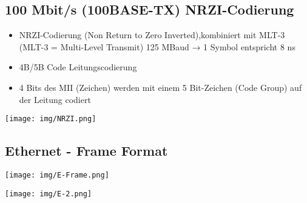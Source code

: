 \subsection{100 Mbit/s (100BASE-TX) NRZI-Codierung }{
    {  \begin{itemize}[noitemsep]
                \item NRZI-Codierung (Non Return to Zero Inverted),kombiniert mit MLT-3 (MLT-3 = Multi-Level Transmit) 125 MBaud → 1 Symbol entspricht 8 ns
                \item 4B/5B Code Leitungscodierung
                \item 4 Bits des MII (Zeichen) werden mit einem 5 Bit-Zeichen (Code Group) auf der Leitung codiert
            \end{itemize}

            \texttt{[image: img/NRZI.png]}

        }

}
\vfill\null
\columnbreak
\subsection{Ethernet - Frame Format}{
    \texttt{[image: img/E-Frame.png]}

    \texttt{[image: img/E-2.png]}
}



